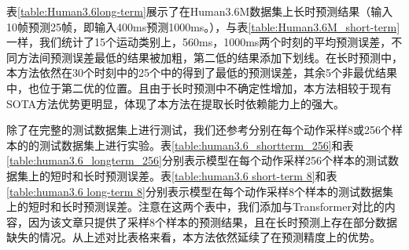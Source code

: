 表\ref{table:Human3.6long-term}展示了在Human3.6M数据集上长时预测结果（输入10帧预测25帧，即输入400ms预测1000ms。），与表\ref{table:Human3.6M_short-term}一样，我们统计了15个运动类别上，560ms，1000ms两个时刻的平均预测误差，不同方法间预测误差最低的结果被加粗，第二低的结果添加下划线。在长时预测中，本方法依然在30个时刻中的25个中的得到了最低的预测误差，其余5个非最优结果中，也位于第二优的位置。且由于长时预测中不确定性增加，本方法相较于现有SOTA方法优势更明显，体现了本方法在提取长时依赖能力上的强大。

除了在完整的测试数据集上进行测试，我们还参考\parencite{li2020dynamic, mao2019learning, martinez2017human,mao2020history}分别在每个动作采样8或256个样本的的测试数据集上进行实验。表\ref{table:human3.6_shortterm_256}和表\ref{table:human3.6_longterm_256}分别表示模型在每个动作采样256个样本的测试数据集上的短时和长时预测误差。表\ref{table:human3.6 short-term 8}和表\ref{table:human3.6 long-term 8}分别表示模型在每个动作采样8个样本的测试数据集上的短时和长时预测误差。注意在这两个表中，我们添加与Transformer\parencite{aksan2021spatio}对比的内容，因为该文章只提供了采样8个样本的预测结果，且在长时预测上存在部分数据缺失的情况。从上述对比表格来看，本方法依然延续了在预测精度上的优势。

\clearpage

